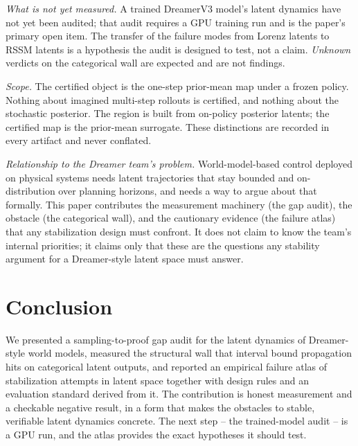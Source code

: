 \documentclass[journal]{IEEEtran}
\begin{document}
\emph{What is not yet measured.} A trained DreamerV3 model's latent dynamics
have not yet been audited; that audit requires a GPU training run and is the
paper's primary open item. The transfer of the failure modes from Lorenz
latents to RSSM latents is a hypothesis the audit is designed to test, not a
claim. \emph{Unknown} verdicts on the categorical wall are expected and are
not findings.

\emph{Scope.} The certified object is the one-step prior-mean map under a
frozen policy. Nothing about imagined multi-step rollouts is certified, and
nothing about the stochastic posterior. The region is built from on-policy
posterior latents; the certified map is the prior-mean surrogate. These
distinctions are recorded in every artifact and never conflated.

\emph{Relationship to the Dreamer team's problem.} World-model-based control
deployed on physical systems needs latent trajectories that stay bounded and
on-distribution over planning horizons, and needs a way to argue about that
formally. This paper contributes the measurement machinery (the gap audit),
the obstacle (the categorical wall), and the cautionary evidence (the
failure atlas) that any stabilization design must confront. It does not
claim to know the team's internal priorities; it claims only that these are
the questions any stability argument for a Dreamer-style latent space must
answer.

\section{Conclusion}

We presented a sampling-to-proof gap audit for the latent dynamics of
Dreamer-style world models, measured the structural wall that interval bound
propagation hits on categorical latent outputs, and reported an empirical
failure atlas of stabilization attempts in latent space together with design
rules and an evaluation standard derived from it. The contribution is honest
measurement and a checkable negative result, in a form that makes the
obstacles to stable, verifiable latent dynamics concrete. The next step --
the trained-model audit -- is a GPU run, and the atlas provides the exact
hypotheses it should test.
\end{document}
